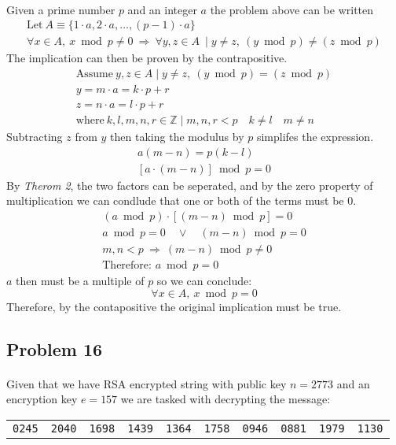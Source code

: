 \documentclass[11pt]{article}
\begin{document}
\paragraph*{}
Given a prime number $p$ and an integer $a$ the problem above can be written
\begin{gather*}
	\textrm{Let}\ A \equiv \{1 \cdot a, 2 \cdot a, \dots,(p-1) \cdot a\} \\
	\forall x \in A,\ x \bmod p \neq 0 \ \Rightarrow \ \forall y,z \in A\ \mid y 
		\neq z,\ \left(y \bmod p \right) \neq \left (z \bmod p \right)
\end{gather*}
The implication can then be proven by the contrapositive.
\begin{gather*}
	\textrm{Assume} \ y,z \in A \mid y \neq z,\ \left(y \bmod p \right) = \left(z \bmod p \right)\\
	y = m \cdot a = k \cdot p + r \\
	z = n \cdot a = l \cdot p + r \\
	\textrm{where} \ k,l,m,n,r \in \mathbb{Z} \mid  m,n,r < p \quad k \neq l \quad m \neq n 
\end{gather*}
Subtracting $z$ from $y$ then taking the modulus by $p$ simplifes the expression.
\begin{gather*}
	a(m-n) = p(k-l) \\
	\left [ a\cdot (m-n) \right ] \bmod p = 0
\end{gather*}
By \textit{Therom 2}, the two factors can be seperated, and by the zero property of multiplication we can
condlude that one or both of the terms must be 0.
\begin{gather*}
	(a \bmod p)\cdot \left [(m-n) \bmod p \right] = 0 \\
	a \bmod p = 0 \quad \lor \quad (m-n) \bmod p = 0 \\
	m,n < p \ \Rightarrow \ (m-n) \bmod p \neq 0 \\
	\textrm{Therefore: } a \bmod p = 0 
\end{gather*}
$a$ then must be a multiple of $p$ so we can conclude:
\begin{equation*}
	\forall x \in A,\ x \bmod p = 0
\end{equation*}
Therefore, by the contapositive the original implication must be true.

\subsection*{Problem 16}
\paragraph*{}
Given that we have RSA encrypted string with public key $n = 2773$ and an encryption key $e=157$
we are tasked with decrypting the message:
\begin{tabular}{l l l l l l l l l l}
	\texttt{0245} & \texttt{2040} & \texttt{1698} & \texttt{1439} & \texttt{1364} & \texttt{1758} &
	\texttt{0946} & \texttt{0881} & \texttt{1979} & \texttt{1130} 
\end{tabular}
\end{document}
